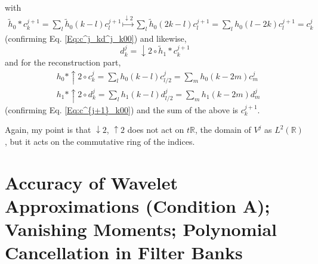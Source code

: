 \documentclass[twoside]{amsart}
\theoremstyle{plain}
\theoremstyle{definition}
\theoremstyle{remark}
\numberwithin{equation}{section}
\begin{document}

with
\[
\begin{gathered}
  \widetilde{h}_0*c_k^{j+1} = \sum_l \widetilde{h}_0(k-l)c_l^{j+1} \overset{ \downarrow 2}{\mapsto} \sum_l \widetilde{h}_0(2k-l) c_l^{j+1} = \sum_l h_0(l-2k) c_l^{j+1} = c_k^j
\end{gathered}
\]
(confirming Eq. \ref{Eq:c^j_kd^j_k00}) and likewise,
\[
d^j_k = \downarrow 2 \circ \widetilde{h}_1 * c_k^{j+1}
\]
and for the reconstruction part, 
\[
\begin{aligned}
  & h_0 * \uparrow 2 \circ c_k^j = \sum_l h_0(k-l)c^j_{l/2} = \sum_m h_0(k-2m) c^j_m \\ 
  & h_1 * \uparrow 2 \circ d_k^j = \sum_l h_1(k-l)d^j_{l/2} = \sum_m h_1(k-2m) d^j_m 
\end{aligned}
\]
(confirming Eq. \ref{Eq:c^{j+1}_k00}) and the sum of the above is $c_k^{j+1}$.  

Again, my point is that $\downarrow 2$, $\uparrow 2$ does not act on $t \mathbb{R}$, the domain of $V^j$ as $L^2(\mathbb{R})$, but it acts on the commutative ring of the indices.  



\section{Accuracy of Wavelet Approximations (Condition A); Vanishing Moments; Polynomial Cancellation in Filter Banks}
\end{document}
